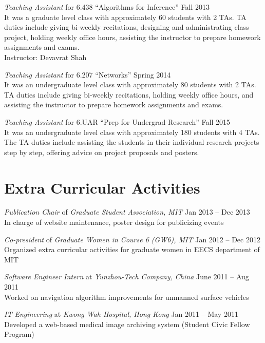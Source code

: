 \documentclass[margin,line,11pt]{resume}
\begin{document}
\begin{resume}
\textsl{Teaching Assistant} for 6.438 ``Algorithms for Inference'' \hfill {Fall 2013}
\\
It was a graduate level class with approximately 60 students with 2 TAs.
TA duties include giving bi-weekly recitations, designing and administrating class
project, holding weekly office hours, assisting the instructor to prepare homework
assignments and exams.
\\
Instructor: Devavrat Shah

\textsl{Teaching Assistant} for 6.207 ``Networks'' \hfill {Spring 2014}
\\
It was an undergraduate level class with approximately 80 students with 2 TAs.
TA duties include giving bi-weekly recitations, holding weekly office hours, and assisting
the instructor to prepare homework assignments and exams.

\textsl{Teaching Assistant} for 6.UAR ``Prep for Undergrad Research'' \hfill {Fall
  2015}
\\
It was an undergraduate level class with approximately 180 students with 4 TAs.
The TA duties include assisting the students in their individual research projects step by
step, offering advice on project proposals and posters.



\section{\mysidestyle Extra Curricular Activities}

{\sl Publication Chair} of {\sl Graduate Student Association, MIT} \hfill Jan 2013 --
Dec 2013
\\
In charge of website maintenance, poster design for publicizing events

{\sl Co-president} of {\sl Graduate Women in Course 6 (GW6), MIT} \hfill Jan 2012 -- Dec 2012
\\
Organized extra curricular activities for graduate women in EECS department of MIT


{\sl Software Engineer Intern} at {\sl Yunzhou-Tech Company, China} \hfill June 2011 -- Aug 2011
\\
Worked on navigation algorithm improvements for unmanned surface vehicles

{\sl IT Engineering} at {\sl Kwong Wah Hospital, Hong Kong} \hfill Jan 2011 --
May 2011
\\
Developed a web-based medical image archiving system  (Student Civic Fellow Program)


\end{resume}
\end{document}
